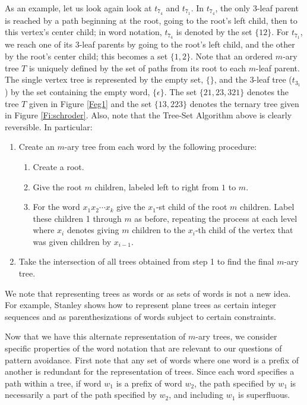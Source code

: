 \documentclass[12pt]{article}
\begin{document}
As an example, let us look again look at $t_{7_4}$ and $t_{7_1}$.  In $t_{7_4}$, the only $3$-leaf parent is reached by a path beginning at the root, going to the root's left child, then to this vertex's center child; in word notation, $t_{7_4}$ is denoted by the set $\{ 12 \}$.  For $t_{7_1}$, we reach one of its 3-leaf parents by going to the root's left child, and the other by the root's center child; this becomes a set $\{ 1,2 \}$.  Note that an ordered $m$-ary tree $T$ is uniquely defined by the set of paths from its root to each $m$-leaf parent.  The single vertex tree is represented by the empty set, $\{\}$, and the 3-leaf tree ($t_{3_1}$) by the set containing the empty word, $\{\epsilon\}$.  The set $\{21, 23, 321\}$ denotes the tree $T$ given in Figure \ref{Feg1} and the set $\{13, 223\}$ denotes the ternary tree given in Figure \ref{Fi:schroder}.  Also, note that the Tree-Set Algorithm above is clearly reversible.  In particular:

\begin{enumerate}
\item Create an $m$-ary tree from each word by the following procedure:
\begin{enumerate}
\item Create a root.
\item Give the root $m$ children, labeled left to right from $1$ to $m$.
\item For the word $x_1x_2 \cdots x_k$ give the $x_1$-st child of the root $m$ children. Label these children 1 through $m$ as before, repeating the process at each level where $x_i$ denotes giving $m$ children to the $x_i$-th child of the vertex that was given children by $x_{i-1}$. 
\end{enumerate}
\item Take the intersection of all trees obtained from step 1 to find the final $m$-ary tree.
\end{enumerate}

We note that representing trees as words or as sets of words is not a new idea.  For example, Stanley \cite{Stanley99} shows how to represent plane trees as certain integer sequences and as parenthesizations of words subject to certain constraints. 

Now that we have this alternate representation of $m$-ary trees, we consider specific properties of the word notation that are relevant to our questions of pattern avoidance.  First note that any set of words where one word is a prefix of another is redundant for the representation of trees.  Since each word specifies a path within a tree, if word $w_1$ is a prefix of word $w_2$, the path specified by $w_1$ is necessarily a part of the path specified by $w_2$, and including $w_1$ is superfluous.
\end{document}
